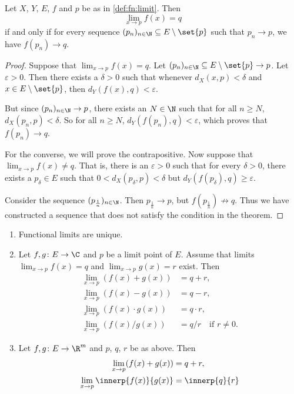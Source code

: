 \begin{theorem}
\label{thm:fn:limit:sequential}
    Let $X$, $Y$, $E$, $f$ and $p$ be as in \cref{def:fn:limit}.
    Then \[
        \lim_{x \to p} f(x) = q
    \] if and only if for every sequence
    $(p_n)_{n \in \N} \subseteq E \setminus \set{p}$ such that $p_n \to p$,
    we have $f(p_n) \to q$.
\end{theorem}
\begin{proof}
    Suppose that $\lim_{x \to p} f(x) = q$.
    Let $(p_n)_{n \in \N} \subseteq E \setminus \set{p} \to p$.
    Let $\varepsilon > 0$.
    Then there exists a $\delta > 0$ such that whenever
    $d_X(x, p) < \delta$ and $x \in E \setminus \set{p}$,
    then $d_Y(f(x), q) < \varepsilon$.

    But since $(p_n)_{n \in \N} \to p$, there exists an $N \in \N$ such that
    for all $n \ge N$, $d_X(p_n, p) < \delta$.
    So for all $n \ge N$, $d_Y(f(p_n), q) < \varepsilon$, which proves that
    $f(p_n) \to q$.

    For the converse, we will prove the contrapositive.
    Now suppose that $\lim_{x \to p} f(x) \ne q$.
    That is, there is an $\varepsilon > 0$ such that for every $\delta > 0$,
    there exists a $p_\delta \in E$ such that
    $0 < d_X(p_\delta, p) < \delta$ but
    $d_Y(f(p_\delta), q) \ge \varepsilon$.

    Consider the sequence $(p_{\frac1n})_{n \in \N}$.
    Then $p_{\frac1n} \to p$, but $f(p_{\frac1n}) \not\to q$.
    Thus we have constructed a sequence that does not satisfy the condition
    in the theorem.
\end{proof}
\begin{corollary} \leavevmode
    \begin{enumerate}
        \item Functional limits are unique.
        \item Let $f, g\colon E \to \C$ and $p$ be a limit point of $E$.
        Assume that limits $\lim_{x \to p} f(x) = q$ and
        $\lim_{x \to p} g(x) = r$ exist.
        Then \begin{align*}
            \lim_{x \to p} (f(x) + g(x)) &= q + r, \\
            \lim_{x \to p} (f(x) - g(x)) &= q - r, \\
            \lim_{x \to p} (f(x) \cdot g(x)) &= q \cdot r, \\
            \lim_{x \to p} (f(x) / g(x)) &= q / r
                \quad \text{if } r \ne 0.
        \end{align*}
        \item Let $f, g\colon E \to \R^m$ and $p$, $q$, $r$ be as above.
        Then \begin{align*}
            \lim_{x \to p} (f(x) + g(x)) &= q + r, \\
            \lim_{x \to p} \innerp{f(x)}{g(x)} &= \innerp{q}{r}
        \end{align*}
    \end{enumerate}
\end{corollary}

